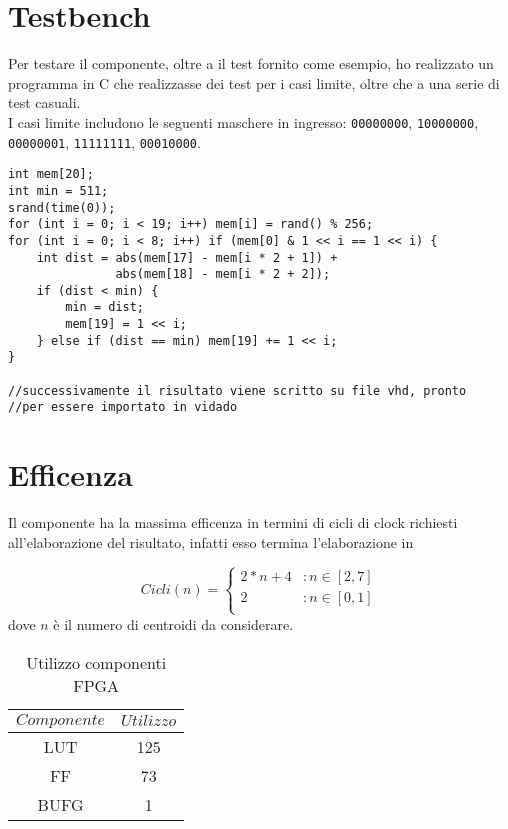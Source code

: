 \documentclass[a4paper]{report}
\begin{document}
\section{Testbench}
Per testare il componente, oltre a il test fornito come esempio, ho realizzato un programma in C che realizzasse dei test per i casi limite, oltre che a una serie di test casuali.\\
I casi limite includono le seguenti maschere in ingresso: \texttt{00000000}, \texttt{10000000}, \texttt{00000001}, \texttt{11111111}, \texttt{00010000}.
\begin{verbatim}
int mem[20];
int min = 511;
srand(time(0));
for (int i = 0; i < 19; i++) mem[i] = rand() % 256;
for (int i = 0; i < 8; i++) if (mem[0] & 1 << i == 1 << i) {
    int dist = abs(mem[17] - mem[i * 2 + 1]) + 
               abs(mem[18] - mem[i * 2 + 2]);
    if (dist < min) {
        min = dist;
        mem[19] = 1 << i;
    } else if (dist == min) mem[19] += 1 << i;
}

//successivamente il risultato viene scritto su file vhd, pronto
//per essere importato in vidado
\end{verbatim}

\newpage
\section{Efficenza}
Il componente ha la massima efficenza in termini di cicli di clock richiesti all'elaborazione del risultato, infatti esso termina l'elaborazione in

\[Cicli(n) =
\left\{
  \begin{array}{lr}
    2 * n + 4&: n\in[2,7]\\
    2&: n\in[0,1]\\
  \end{array}
\right.\]
dove $n$ è il numero di centroidi da considerare.

\begin{center}
\begin{table}[H]
    \centering
    \begin{tabular}{|c||c|}
        \hline
        $Componente$&$Utilizzo$\\
        \hline
        LUT&125\\
        FF&73\\
        BUFG&1\\
        \hline
    \end{tabular}
    \caption{Utilizzo componenti FPGA}
\end{table}
\end{center}

{}

\end{document}
